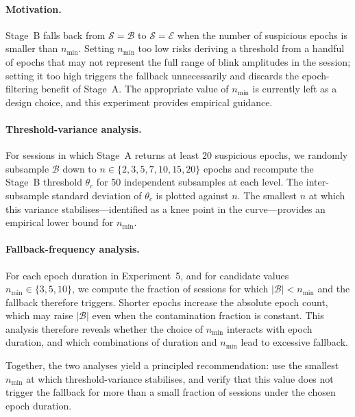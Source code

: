 \paragraph{Motivation.}
Stage~B falls back from $\mathcal{S}=\mathcal{B}$ to $\mathcal{S}=\mathcal{E}$
when the number of suspicious epochs is smaller than $n_{\min}$.
Setting $n_{\min}$ too low risks deriving a threshold from a handful of epochs
that may not represent the full range of blink amplitudes in the session;
setting it too high triggers the fallback unnecessarily and discards the
epoch-filtering benefit of Stage~A.
The appropriate value of $n_{\min}$ is currently left as a design choice,
and this experiment provides empirical guidance.

\paragraph{Threshold-variance analysis.}
For sessions in which Stage~A returns at least 20 suspicious epochs, we randomly
subsample $\mathcal{B}$ down to $n \in \{2, 3, 5, 7, 10, 15, 20\}$ epochs and
recompute the Stage~B threshold $\theta_c$ for 50 independent subsamples at
each level.
The inter-subsample standard deviation of $\theta_c$ is plotted against $n$.
The smallest $n$ at which this variance stabilises---identified as a knee point
in the curve---provides an empirical lower bound for $n_{\min}$.

\paragraph{Fallback-frequency analysis.}
For each epoch duration in Experiment~5, and for candidate values
$n_{\min} \in \{3, 5, 10\}$, we compute the fraction of sessions for which
$|\mathcal{B}| < n_{\min}$ and the fallback therefore triggers.
Shorter epochs increase the absolute epoch count, which may raise $|\mathcal{B}|$
even when the contamination fraction is constant.
This analysis therefore reveals whether the choice of $n_{\min}$ interacts with
epoch duration, and which combinations of duration and $n_{\min}$ lead to
excessive fallback.

Together, the two analyses yield a principled recommendation: use the smallest
$n_{\min}$ at which threshold-variance stabilises, and verify that this value
does not trigger the fallback for more than a small fraction of sessions under
the chosen epoch duration.
